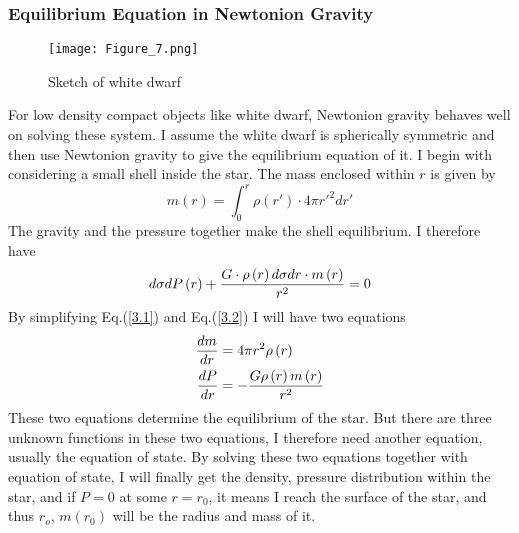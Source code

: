 \documentclass[reprint]{revtex4-1}
\begin{document}
\subsubsection{Equilibrium Equation in Newtonion Gravity}
\begin{figure}
	\centering   
	\texttt{[image: Figure\_7.png]}  
	\caption{Sketch of white dwarf} 
	\label{fig:7} 
\end{figure}
For low density compact objects like white dwarf, Newtonion gravity behaves well on solving these system. I assume the white dwarf is spherically symmetric and then use Newtonion gravity to give the equilibrium equation of it. I begin with considering a small shell inside the star. The mass enclosed within $r$ is given by
\begin{equation}
m\left( r \right) = \int_0^r {\rho \left( {r'} \right) \cdot 4\pi r{'^2}} dr' \label{3.1}
\end{equation}
The gravity and the pressure together make the shell equilibrium. I therefore have
\begin{equation}
d\sigma dP\left( r \right) + {{G \cdot \rho \left( r \right)d\sigma dr \cdot m\left( r \right)} \over {{r^2}}} = 0 \label{3.2}
\end{equation}
By simplifying Eq.(\ref{3.1}) and Eq.(\ref{3.2}) I will have two equations
\begin{align}
{{dm} \over {dr}} &= 4\pi {r^2}\rho \left( r \right) \label{3.3}\\
{{dP} \over {dr}} &=  - {{G\rho \left( r \right)m\left( r \right)} \over {{r^2}}} \label{3.4}
\end{align}
These two equations determine the equilibrium of the star. But there are three unknown functions in these two equations, I therefore need another equation, usually the equation of state. By solving these two equations together with equation of state, I will finally get the density, pressure distribution within the star, and if $P=0$ at some $r=r_0$, it means I reach the surface of the star, and thus $r_o$, $m(r_0)$ will be the radius and mass of it. 
\end{document}
